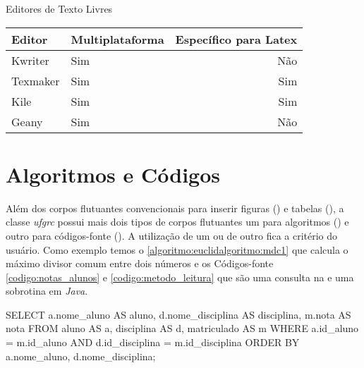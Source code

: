 \begin{quadro}[htb]
\caption{Editores de Texto Livres}
\label{quadro:editores_texto_livres}
\centering
\begin{tabular}{|l|l|r|}        \hline
Editor     & Multiplataforma & Específico para Latex \\ \hline
Kwriter    & Sim             & Não                   \\
Texmaker   & Sim             & Sim                   \\
Kile       & Sim             & Sim                   \\
Geany      & Sim             & Não                   \\ \hline
\end{tabular}
\end{quadro}

\section{Algoritmos e Códigos}
\label{secao:algoritmos_e_codigos}

Além dos corpos flutuantes convencionais para inserir figuras () e tabelas (), a classe \textit{ufgrc} possui mais dois tipos de corpos flutuantes um para algoritmos () e outro para códigos-fonte (). A utilização de um ou de outro fica a critério do usuário. Como exemplo temos o \autoref{algoritmo:euclidalgoritmo:mdc1} que calcula o máximo divisor comum entre dois números e os Códigos-fonte \ref{codigo:notas_alunos} e \ref{codigo:metodo_leitura} que são uma consulta na  e uma sobrotina em \textit{Java}.


%

\begin{codigo}[caption = {Consulta SQL}, label={codigo:notas_alunos},language=SQL, breaklines=true]
SELECT a.nome_aluno AS aluno,
       d.nome_disciplina AS disciplina,
       m.nota AS nota
FROM aluno AS a,
     disciplina AS d,
     matriculado AS m
WHERE a.id_aluno = m.id_aluno
  AND d.id_disciplina = m.id_disciplina
ORDER BY a.nome_aluno, d.nome_disciplina;
\end{codigo}

